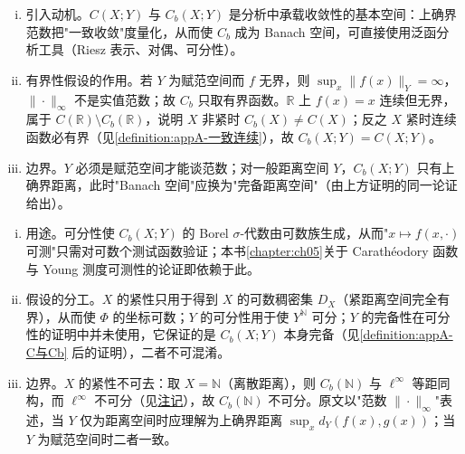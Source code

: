 \documentclass[../main.tex]{subfiles}
\begin{document}
\begin{remark}\label{remark:appA-连续函数空间}
\begin{enumerate}[(i)]
\item 引入动机。$C(X;Y)$ 与 $C_b(X;Y)$ 是分析中承载收敛性的基本空间：上确界范数把"一致收敛"度量化，从而使 $C_b$ 成为 Banach 空间，可直接使用泛函分析工具（Riesz 表示、对偶、可分性）。
\item 有界性假设的作用。若 $Y$ 为赋范空间而 $f$ 无界，则 $\sup_x\|f(x)\|_Y=\infty$，$\|\cdot\|_\infty$ 不是实值范数；故 $C_b$ 只取有界函数。$\mathbb{R}$ 上 $f(x)=x$ 连续但无界，属于 $C(\mathbb{R})\setminus C_b(\mathbb{R})$，说明 $X$ 非紧时 $C_b(X)\neq C(X)$；反之 $X$ 紧时连续函数必有界（见\cref{definition:appA-一致连续}），故 $C_b(X;Y)=C(X;Y)$。
\item 边界。$Y$ 必须是赋范空间才能谈范数；对一般距离空间 $Y$，$C_b(X;Y)$ 只有上确界距离，此时"Banach 空间"应换为"完备距离空间"（由上方证明的同一论证给出）。
\end{enumerate}
\end{remark}

\begin{remark}\label{remark:appA-Cb可分}
\begin{enumerate}[(i)]
\item 用途。可分性使 $C_b(X;Y)$ 的 Borel $\sigma$-代数由可数族生成，从而"$x\mapsto f(x,\cdot)$ 可测"只需对可数个测试函数验证；本书\cref{chapter:ch05}关于 Carathéodory 函数与 Young 测度可测性的论证即依赖于此。
\item 假设的分工。$X$ 的紧性只用于得到 $X$ 的可数稠密集 $D_X$（紧距离空间完全有界），从而使 $\Phi$ 的坐标可数；$Y$ 的可分性用于使 $Y^{\mathbb{N}}$ 可分；$Y$ 的完备性在可分性的证明中并未使用，它保证的是 $C_b(X;Y)$ 本身完备（见\cref{definition:appA-C与Cb} 后的证明），二者不可混淆。
\item 边界。$X$ 的紧性不可去：取 $X=\mathbb{N}$（离散距离），则 $C_b(\mathbb{N})$ 与 $\ell^\infty$ 等距同构，而 $\ell^\infty$ 不可分（见\hyperref[remark:appA-可分]{注记}），故 $C_b(\mathbb{N})$ 不可分。原文以"范数 $\|\cdot\|_\infty$"表述，当 $Y$ 仅为距离空间时应理解为上确界距离 $\sup_xd_Y(f(x),g(x))$；当 $Y$ 为赋范空间时二者一致。
\end{enumerate}
\end{remark}
\end{document}
